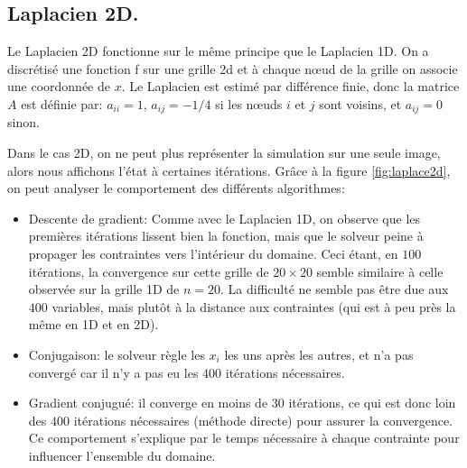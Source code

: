 \documentclass[notitlepage,oneside]{book}
\begin{document}
\subsection{Laplacien 2D.}
	
Le Laplacien 2D fonctionne sur le même principe que le Laplacien
1D. On a discrétisé une fonction f sur une grille 2d et à chaque nœud
de la grille on associe une coordonnée de $x$. Le Laplacien est estimé
par différence finie, donc la matrice $A$ est définie par: $a_{ii}=1$,
$a_{ij}=-1/4$ si les n{\oe}uds $i$ et $j$ sont voisins, et $a_{ij}=0$
sinon.
	
Dans le cas 2D, on ne peut plus représenter la simulation sur une
seule image, alors nous affichons l'état à certaines itérations. Grâce
à la figure \ref{fig:laplace2d}, on peut analyser le comportement des
différents algorithmes:
\begin{itemize}
\item Descente de gradient: Comme avec le Laplacien 1D, on observe que
  les premières itérations lissent bien la fonction, mais que le
  solveur peine à propager les contraintes vers l'intérieur du
  domaine. Ceci étant, en $100$ itérations, la convergence sur cette
  grille de $20 \times 20$ semble similaire à celle observée sur la
  grille 1D de $n=20$. La difficulté ne semble pas être due aux $400$
  variables, mais plutôt à la distance aux contraintes (qui est à peu
  près la même en 1D et en 2D).
\item Conjugaison: le solveur règle les $x_i$ les uns après les
  autres, et n'a pas convergé car il n'y a pas eu les 400 itérations
  nécessaires.
\item Gradient conjugué: il converge en moins de $30$ itérations, ce
  qui est donc loin des $400$ itérations nécessaires (méthode directe)
  pour assurer la convergence. Ce comportement s'explique par le temps
  nécessaire à chaque contrainte pour influencer l'ensemble du
  domaine.
\end{itemize}
	
	
%	
\end{document}
